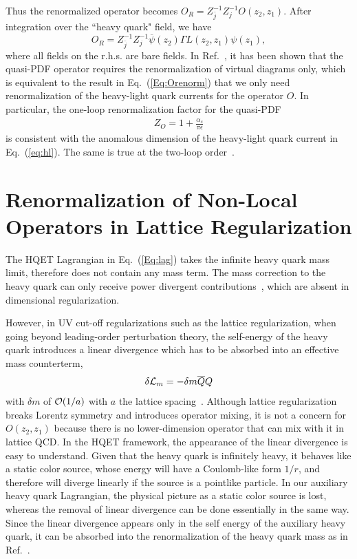 \documentclass[prd,aps,twocolumn,preprintnumbers, showpacs, nofootinbib,superscriptaddress,notitlepage]{revtex4-1}
\newcommand{\beq}{\begin{eqnarray}}
\newcommand{\eeq}{\end{eqnarray}}
\begin{document}
Thus the renormalized operator becomes $O_R=Z_{\bar j}^{-1}Z_{j}^{-1}O(z_2,z_1)$. After integration over the ``heavy quark" field, we have
\begin{equation}\label{Eq:Orenorm}
        O_R = Z_{\bar j}^{-1}Z_{j}^{-1} \overline{\psi}(z_2) \Gamma L(z_2,z_1)\psi(z_1),
\end{equation}
where all fields on the r.h.s. are bare fields. In Ref.~\cite{Ji:2015jwa}, it has been shown that the quasi-PDF operator requires the renormalization of virtual diagrams only, which is equivalent to the result in Eq.~(\ref{Eq:Orenorm}) that we only need renormalization of the heavy-light quark currents for the operator $O$. In particular, the one-loop renormalization factor for the quasi-PDF
\beq\label{Eq:1loopZfac}
Z_O=1+\frac{\alpha_s }{\pi\epsilon}
\eeq
is consistent with the anomalous dimension of the heavy-light quark current in Eq.~(\ref{eq:hl}). The same is true at the two-loop order~\cite{Ji:2015jwa}.


\section{Renormalization of Non-Local Operators in Lattice Regularization}

The HQET Lagrangian in Eq.~(\ref{Eq:lag}) takes the infinite heavy quark mass limit,
therefore does not contain any mass term. The mass correction to the heavy quark can only receive power divergent contributions~\cite{Maiani:1991az}, which are absent in dimensional regularization.

 

However, in UV cut-off regularizations such as the lattice regularization,
when going beyond leading-order perturbation theory, the self-energy of the heavy quark introduces a linear divergence which
has to be absorbed into an effective mass counterterm,
\begin{equation}
    \delta {\cal L}_m =  -\delta m\overline{Q} Q
\end{equation}
with $\delta m$ of ${\cal O}(1/a)$ with $a$ the lattice spacing~\cite{Maiani:1991az}. Although lattice regularization breaks Lorentz symmetry and introduces operator mixing, it is not a concern for $O(z_2,z_1)$ because there is no lower-dimension operator that can mix with it in lattice QCD.
In the HQET framework, the appearance of the linear divergence is easy to understand. Given that the heavy quark is infinitely heavy, it behaves like a static color source, whose energy will have a Coulomb-like form $1/r$, and therefore will diverge linearly if the source is a pointlike particle.
In our auxiliary heavy quark Lagrangian, the physical picture as a static color source is lost, whereas the removal of linear divergence can be done essentially in the same way. Since the linear divergence appears only in the self energy of the auxiliary heavy quark, it can be absorbed into the renormalization of the heavy quark mass as in Ref.~\cite{Maiani:1991az}. 
\end{document}
